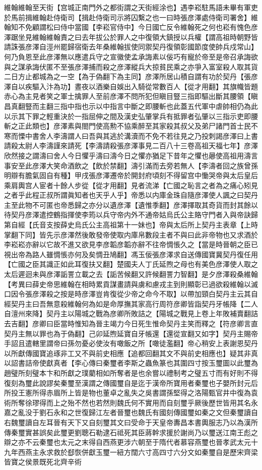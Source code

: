 維翰維翰至天街【宫城正南門外之都街謂之天街經涂也】遇李崧駐馬語未畢有軍吏於馬前揖維翰赴侍衛司【揖赴侍衛司示將囚繫之也一曰時張彦澤處侍衛司署舍】維翰知不免顧謂松曰侍中當國【李崧官侍中】今日國亡反令維翰死之何也崧有愧色彦澤踞坐見維翰維翰責之曰去年拔公於罪人之中復領大鎮授以兵權【謂高祖時朝野皆請誅張彦澤自涇州罷歸宿衛去年桑維翰拔使同禦契丹復領彰國節度使帥兵戍常山】何乃負恩至此彦澤無以應遣兵守之宣徽使孟承誨素以佞巧有寵於帝至是帝召承誨欲與之謀承誨伏匿不至張彦澤捕而殺之彦澤縱兵大掠貧民乘之亦爭入富室殺人取其貨二日方止都城為之一空【為于偽翻下為主同】彦澤所居山積自謂有功於契丹【張彦澤自以疾驅入汴為功】晝夜以酒樂自娛出入騎從常數百人【從才用翻】其旗幟皆題赤心為主見者笑之軍士擒罪人至前彦澤不問所犯但瞋目豎三指即驅出斷其腰領【瞋昌真翻豎而主翻三指中指也示以中指言中斷之即腰斬也此蓋五代軍中虐帥相仍為此以示其下罪之輕重決於一指屈伸之間及漢史弘肇掌兵有抵罪者弘肇以三指示吏即腰斬之正此類也】彦澤素與閤門使高勲不協乘醉至其家殺其叔父及弟尸諸門首士民不寒而慄中書舍人李濤謂人曰吾與其逃於溝瀆而不免不若往見之乃投刺謁彦澤曰上書請殺太尉人李濤謹來請死【李濤請殺張彦澤事見二百八十三卷高祖天福七年】彦澤欣然接之謂濤曰舍人今日懼乎濤曰濤今日之懼亦猶足下昔年之懼也曏使高祖用濤言事安至此彦澤大笑命酒飲之【飲於禁翻】濤引滿而去旁若無人【李濤者回之族曾孫明辯有膽氣固自有種】甲戌張彦澤遷帝於開封府頃刻不得留宫中慟哭帝與太后皇后乘肩輿宫人宦者十餘人步從【從才用翻】見者流涕【亡國之恥言之者為之痛心矧見之者乎此程正叔所謂眞知者也天乎人乎】帝悉以内庫金珠自隨彦澤使人諷之曰契丹主至此物不可匿也帝悉歸之亦分以遺彦澤【遺惟季翻】彦澤擇取其奇貨而封其餘以待契丹彦澤遣控鶴指揮使李筠以兵守帝内外不通帝姑烏氏公主賂守門者入與帝訣歸第自經【氏音支按薛史烏氏公主高祖第十一妹也】帝與太后所上契丹主表章【上時掌翻下同】皆先示彦澤然後敢發帝使取内庫帛數段主者不與曰此非帝物也又求酒於李崧崧亦辭以它故不進又欲見李彦韜彦韜亦辭不往帝惆悵久之【當是時晉朝之臣已視出帝為路人雖惆悵亦何及矣惆丑鳩翻】馮玉佞張彦澤求自送傳國寶冀契丹復任用【亡國之臣其識正如此耳復扶又翻】楚國夫人丁氏延煦之母也有美色彦澤使人取之太后遲迴未與彦澤詬詈立載之去【詬苦候翻又許候翻詈力智翻】是夕彦澤殺桑維翰　【考異曰薛史帝思維翰在相時累貢謀畫請與虜和慮戎主到則顯彰已過欲殺維翰以滅口因令張彦澤殺之按是時彦澤豈肯復從少帝之命今不取】以帶加頸白契丹主云其自經契丹主曰吾無意殺維翰何為如是命厚撫其家高行周符彦卿皆詣契丹牙帳降【二人自澶州來降】契丹主以陽城之戰為彦卿所敗詰之【陽城之戰見上卷上年敗補賣翻詰去吉翻】彦卿曰臣當時惟知為晉主竭力今日死生惟命契丹主笑而釋之【符彦卿言直契丹主無以罪也為于偽翻】己卯延煦延寶自牙帳還【還從宣翻又如字】契丹主賜帝手詔且遣轄里謂帝曰孫勿憂必使汝有噉飯之所【噉徒濫翻】帝心稍安上表謝恩契丹以所獻傳國寶追琢非工又不與前史相應【追都回翻其文不與前史相應也】疑其非真以詔書詰帝使獻真者【李心傳曰秦璽者李斯之蟲魚篆也其圍四寸按玉璽圖以此璽為趙璧所刻璧本卞和所獻之璞藺相如所奪者是也余嘗以禮制考之璧五寸而有好則不得復刻為璽此說謬矣秦璽至漢謂之傳國璽自是迄于漢帝所寶用者秦璽也子嬰所封元后所投王憲所得赤眉所上皆是物也董卓之亂失之吳書謂孫堅得之洛陽甄官井中復為袁術所奪徐璆得而上之殆不然也若然則魏氏何不實用而自刻璽乎厥後歷世皆用其名永嘉之亂没于劉石永和之世復歸江左者晉璽也魏氏有國刻傳國璽如秦之文但秦璽讀自右魏璽讀自左耳晉有天下又自刻璽其文曰受命于天皇帝夀昌本書輿服志乃以為漢所傳秦璽實甚誤矣此璽更劉聰石勒逮石祗死其臣蔣幹求援於謝尚乃以璽送江南王彪之辯之亦不云秦璽也太元之末得自西燕更涉六朝至于隋代者慕容燕璽也晉孝武太元十九年西燕主永求救於郄恢併獻玉璽一紐方闊六寸高四寸六分文如秦璽自是歷宋齊梁皆寶之侯景既死北齊辛術